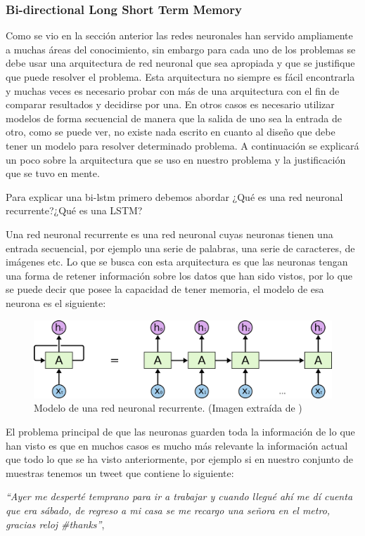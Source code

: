 \subsubsection{Bi-directional Long Short Term Memory}

\par Como se vio en la sección anterior las redes neuronales han servido ampliamente a muchas áreas del conocimiento, sin embargo para cada uno de los problemas se debe usar una arquitectura de red neuronal que sea apropiada y que se justifique que puede resolver el problema. Esta arquitectura no siempre es fácil encontrarla y muchas veces es necesario probar con más de una arquitectura con el fin de comparar resultados y decidirse por una. En otros casos es necesario utilizar modelos de forma secuencial de manera que la salida de uno sea la entrada de otro, como se puede ver, no existe nada escrito en cuanto al diseño que debe tener un modelo para resolver determinado problema. A continuación se explicará un poco sobre la arquitectura que se uso en nuestro problema y la justificación que se tuvo en mente.

\par Para explicar una \gls{bi-lstm} primero debemos abordar ¿Qué es una red neuronal recurrente?¿Qué es una LSTM?

\par Una red neuronal recurrente es una red neuronal cuyas neuronas tienen una entrada secuencial, por ejemplo una serie de palabras, una serie de caracteres, de imágenes etc. Lo que se busca con esta arquitectura es que las neuronas tengan una forma de retener información sobre los datos que han sido vistos, por lo que se puede decir que posee la capacidad de tener memoria, el modelo de esa neurona es el siguiente:

\begin{figure}[H]
	\centering
	\includegraphics[width=\textwidth]{imagenes/RNN-unrolled.png}
	\caption[]{Modelo de una red neuronal recurrente. (Imagen extraída de \cite{christopher_olah_2015}) }
\end{figure}

\par El problema principal de que las neuronas guarden toda la información de lo que han visto es que en muchos casos es mucho más relevante la información actual que todo lo que se ha visto anteriormente, por ejemplo si en nuestro conjunto de muestras tenemos un tweet que contiene lo siguiente:
\vspace{5pt}
\begin{center}
	\textit{``Ayer me desperté temprano para ir a trabajar y cuando llegué ahí me dí cuenta que era sábado, de regreso a mi casa se me recargo una señora en el metro, gracias reloj \#thanks''},
	\label{fig:frase}
\end{center}
\vspace{5pt}

